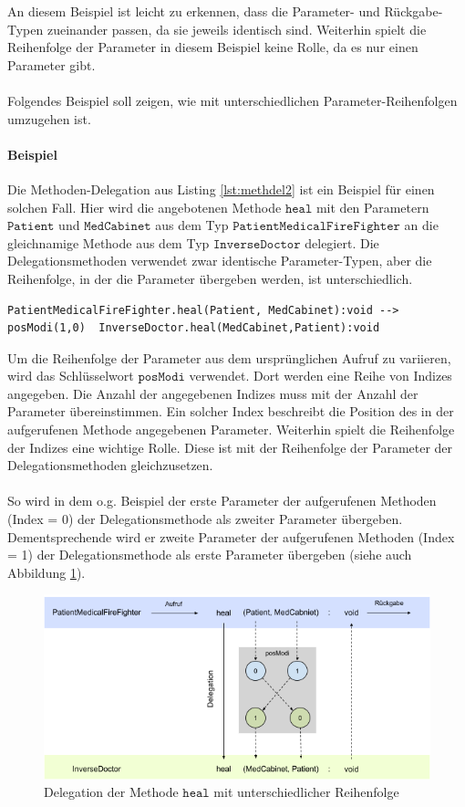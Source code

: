 \documentclass[a4paper,12pt]{article}
\begin{document}
\noindent
An diesem Beispiel ist leicht zu erkennen, dass die Parameter- und Rückgabe-Typen zueinander passen, da sie jeweils identisch sind. Weiterhin spielt die Reihenfolge der Parameter in diesem Beispiel keine Rolle, da es nur einen Parameter gibt.\\\\
Folgendes Beispiel soll zeigen, wie mit unterschiedlichen Parameter-Reihenfolgen umzugehen ist.
\paragraph{Beispiel} Die Methoden-Delegation aus Listing \ref{lst:methdel2} ist ein Beispiel für einen solchen Fall. Hier wird die angebotenen Methode $\texttt{heal}$ mit den Parametern $\texttt{Patient}$ und $\texttt{MedCabinet}$ aus dem Typ $\texttt{PatientMedicalFireFighter}$ an die gleichnamige Methode aus dem Typ $\texttt{InverseDoctor}$ delegiert. Die Delegationsmethoden verwendet zwar identische Parameter-Typen, aber die Reihenfolge, in der die Parameter übergeben werden, ist unterschiedlich. 
\begin{lstlisting}[style = dsl]
	PatientMedicalFireFighter.heal(Patient, MedCabinet):void --> posModi(1,0)  InverseDoctor.heal(MedCabinet,Patient):void
\end{lstlisting}\label{lst:methdel2}
\noindent
Um die Reihenfolge der Parameter aus dem ursprünglichen Aufruf zu variieren, wird das Schlüsselwort $\texttt{posModi}$ verwendet. Dort werden eine Reihe von Indizes angegeben. Die Anzahl der angegebenen Indizes muss mit der Anzahl der Parameter übereinstimmen. Ein solcher Index beschreibt die Position des in der aufgerufenen Methode angegebenen Parameter. Weiterhin spielt die Reihenfolge der Indizes eine wichtige Rolle. Diese ist mit der Reihenfolge der Parameter der Delegationsmethoden gleichzusetzen.\\\\
So wird in dem o.g. Beispiel der erste Parameter der aufgerufenen Methoden (Index = 0) der Delegationsmethode als zweiter Parameter übergeben. Dementsprechende wird er zweite Parameter der aufgerufenen Methoden (Index = 1) der Delegationsmethode als erste Parameter übergeben (siehe auch Abbildung \ref{fig:DEL_healInverse}). 
\begin{figure}[H]
\includegraphics[width=\linewidth]{MDEL_healInverse}
\caption{Delegation der Methode $\texttt{heal}$ mit unterschiedlicher Reihenfolge}
\label{fig:DEL_healInverse}
\end{figure}
\end{document}
